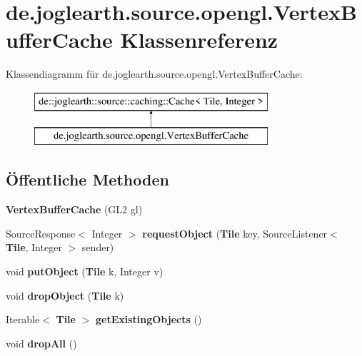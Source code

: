 \section{de.\-joglearth.\-source.\-opengl.\-Vertex\-Buffer\-Cache Klassenreferenz}
\label{classde_1_1joglearth_1_1source_1_1opengl_1_1_vertex_buffer_cache}
Klassendiagramm für de.\-joglearth.\-source.\-opengl.\-Vertex\-Buffer\-Cache\-:\begin{figure}[H]
\begin{center}
\leavevmode
\includegraphics[height=2.000000cm]{classde_1_1joglearth_1_1source_1_1opengl_1_1_vertex_buffer_cache}
\end{center}
\end{figure}
\subsection*{Öffentliche Methoden}
\begin{DoxyCompactItemize}
\item 
{\bfseries Vertex\-Buffer\-Cache} (G\-L2 gl)\label{classde_1_1joglearth_1_1source_1_1opengl_1_1_vertex_buffer_cache_a390dcaaf59a575d03e1d6606d7c4bebf}

\item 
Source\-Response$<$ Integer $>$ {\bfseries request\-Object} ({\bf Tile} key, Source\-Listener$<$ {\bf Tile}, Integer $>$ sender)\label{classde_1_1joglearth_1_1source_1_1opengl_1_1_vertex_buffer_cache_af5bd1090210a2a3965b5f923d4d25cf3}

\item 
void {\bfseries put\-Object} ({\bf Tile} k, Integer v)\label{classde_1_1joglearth_1_1source_1_1opengl_1_1_vertex_buffer_cache_a8d15fb002c3670d792d3d4afc2a99e77}

\item 
void {\bfseries drop\-Object} ({\bf Tile} k)\label{classde_1_1joglearth_1_1source_1_1opengl_1_1_vertex_buffer_cache_acb75192f943155b456587cf0263811f5}

\item 
Iterable$<$ {\bf Tile} $>$ {\bfseries get\-Existing\-Objects} ()\label{classde_1_1joglearth_1_1source_1_1opengl_1_1_vertex_buffer_cache_a5b176c65220e0121d8c2fa6ed094004a}

\item 
void {\bfseries drop\-All} ()\label{classde_1_1joglearth_1_1source_1_1opengl_1_1_vertex_buffer_cache_a76d2df5358cefaae96416a0016d71585}

\end{DoxyCompactItemize}
